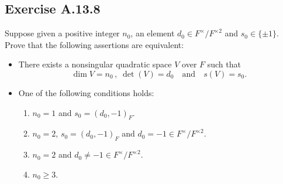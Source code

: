 \documentclass[12pt, a4paper]{article}
\begin{document}
\subsection*{Exercise A.13.8}
Suppose given a positive integer $n_0$, an element $d_0 \in F^\times / F^{\times 2}$ and $s_0 \in \{ \pm 1 \}$. Prove that the following assertions are equivalent:
\begin{itemize}
    \item[(i)] There exists a nonsingular quadratic space $V$ over $F$ such that
    \[ \dim V = n_0 \,,\; \det(V) = d_0 \quad \text{and} \quad s(V) = s_0. \]
    \item[(ii)] One of the following conditions holds:
    \begin{enumerate}
        \item $n_0 = 1$ and $s_0 = (d_0, -1)_F$.
        \item $n_0 = 2$, $s_0 = (d_0, -1)_F$ and $d_0 = -1 \in F^\times / F^{\times 2}$.
        \item $n_0 = 2$ and $d_0 \neq -1 \in F^\times / F^{\times 2}$.
        \item $n_0 \ge 3$.
    \end{enumerate}
\end{itemize}
\end{document}
